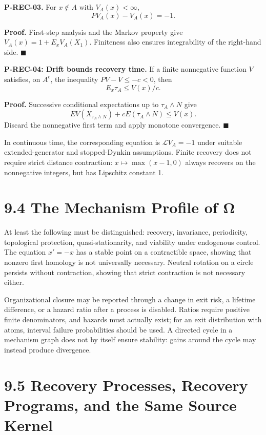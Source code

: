 \documentclass[
  english,
  11pt,
  oneside]{book}
\begin{document}
\hypertarget{p-rec-03}{}\label{p-rec-03}

\textbf{P-REC-03.} For \(x\notin A\) with \(V_A(x)<\infty\), \[PV_A(x)-V_A(x)=-1.\]

\textbf{Proof.} First-step analysis and the Markov property give \(V_A(x)=1+E_xV_A(X_1)\). Finiteness also ensures integrability of the right-hand side. \(\blacksquare\)

\hypertarget{p-rec-04}{}\label{p-rec-04}

\textbf{P-REC-04: Drift bounds recovery time.} If a finite nonnegative function \(V\) satisfies, on \(A^c\), the inequality \(PV-V\le-c<0\), then \[E_x\tau_A\le V(x)/c.\]

\textbf{Proof.} Successive conditional expectations up to \(\tau_A\wedge N\) give \[E V(X_{\tau_A\wedge N})+cE(\tau_A\wedge N)\le V(x).\] Discard the nonnegative first term and apply monotone convergence. \(\blacksquare\)

In continuous time, the corresponding equation is \(\mathcal LV_A=-1\) under suitable extended-generator and stopped-Dynkin assumptions. Finite recovery does not require strict distance contraction: \(x\mapsto\max(x-1,0)\) always recovers on the nonnegative integers, but has Lipschitz constant 1.

\section{9.4 The Mechanism Profile of Ω}\label{the-mechanism-profile-of-ux3c9}

At least the following must be distinguished: recovery, invariance, periodicity, topological protection, quasi-stationarity, and viability under endogenous control. The equation \(x'=-x\) has a stable point on a contractible space, showing that nonzero first homology is not universally necessary. Neutral rotation on a circle persists without contraction, showing that strict contraction is not necessary either.

Organizational closure may be reported through a change in exit risk, a lifetime difference, or a hazard ratio after a process is disabled. Ratios require positive finite denominators, and hazards must actually exist; for an exit distribution with atoms, interval failure probabilities should be used. A directed cycle in a mechanism graph does not by itself ensure stability: gains around the cycle may instead produce divergence.

\section{9.5 Recovery Processes, Recovery Programs, and the Same Source Kernel}\label{recovery-processes-recovery-programs-and-the-same-source-kernel}
\end{document}
